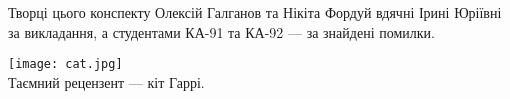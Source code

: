 \newpage
\thispagestyle{empty}
{\LARGE Творці цього конспекту Олексій Галганов та Нікіта Фордуй вдячні Ірині Юріївні за викладання,
а студентами КА-91 та КА-92 --- за знайдені помилки.}
\begin{center}
    \texttt{[image: cat.jpg]}
    \\
    \vspace{3mm}
    {\LARGE Таємний рецензент --- кіт Гаррі.}
\end{center}